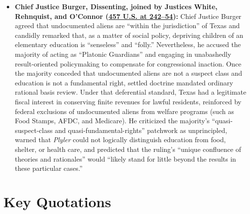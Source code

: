\documentclass[12pt]{article}
\begin{document}
\begin{itemize}
    \item \textbf{Chief Justice Burger, Dissenting, joined by Justices White, Rehnquist, and O'Connor (\href{https://www.law.cornell.edu/supremecourt/text/457/202}{457 U.S. at 242--54}):} Chief Justice Burger agreed that undocumented aliens are ``within the jurisdiction'' of Texas and candidly remarked that, as a matter of social policy, depriving children of an elementary education is ``senseless'' and ``folly.'' Nevertheless, he accused the majority of acting as ``Platonic Guardians'' and engaging in unabashedly result-oriented policymaking to compensate for congressional inaction. Once the majority conceded that undocumented aliens are not a suspect class and education is not a fundamental right, settled doctrine mandated ordinary rational basis review. Under that deferential standard, Texas had a legitimate fiscal interest in conserving finite revenues for lawful residents, reinforced by federal exclusions of undocumented aliens from welfare programs (such as Food Stamps, AFDC, and Medicare). He criticized the majority's ``quasi-suspect-class and quasi-fundamental-rights'' patchwork as unprincipled, warned that \textit{Plyler} could not logically distinguish education from food, shelter, or health care, and predicted that the ruling's ``unique confluence of theories and rationales'' would ``likely stand for little beyond the results in these particular cases.''
\end{itemize}

\section{Key Quotations}
\end{document}
